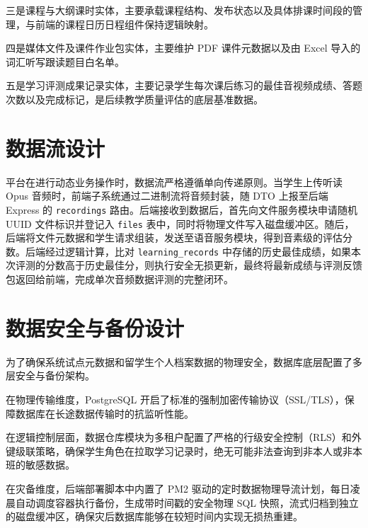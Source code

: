 三是课程与大纲课时实体，主要承载课程结构、发布状态以及具体排课时间段的管理，与前端的课程日历日程组件保持逻辑映射。

四是媒体文件及课件作业包实体，主要维护 PDF 课件元数据以及由 Excel 导入的词汇听写跟读题目白名单。

五是学习评测成果记录实体，主要记录学生每次课后练习的最佳音视频成绩、答题次数以及完成标记，是后续教学质量评估的底层基准数据。

\section{数据流设计}
平台在进行动态业务操作时，数据流严格遵循单向传递原则。当学生上传听读 Opus 音频时，前端子系统通过二进制流将音频封装，随 DTO 上报至后端 Express 的 \texttt{recordings} 路由。后端接收到数据后，首先向文件服务模块申请随机 UUID 文件标识并登记入 \texttt{files} 表中，同时将物理文件写入磁盘缓冲区。随后，后端将文件元数据和学生请求组装，发送至语音服务模块，得到音素级的评估分数。后端经过逻辑计算，比对 \texttt{learning\_records} 中存储的历史最佳成绩，如果本次评测的分数高于历史最佳分，则执行安全无损更新，最终将最新成绩与评测反馈包返回给前端，完成单次音频数据评测的完整闭环。

\section{数据安全与备份设计}
为了确保系统试点元数据和留学生个人档案数据的物理安全，数据库底层配置了多层安全与备份架构。

在物理传输维度，PostgreSQL 开启了标准的强制加密传输协议（SSL/TLS），保障数据库在长途数据传输时的抗监听性能。

在逻辑控制层面，数据仓库模块为多租户配置了严格的行级安全控制（RLS）和外键级联策略，确保学生角色在拉取学习记录时，绝无可能非法查询到非本人或非本班的敏感数据。

在灾备维度，后端部署脚本中内置了 PM2 驱动的定时数据物理导流计划，每日凌晨自动调度容器执行备份，生成带时间戳的安全物理 SQL 快照，流式归档到独立的磁盘缓冲区，确保灾后数据库能够在较短时间内实现无损热重建。
